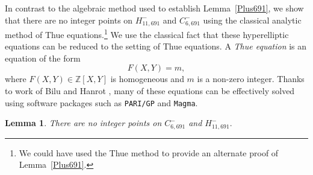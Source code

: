 \documentclass[12pt]{amsart}
\newtheorem{lem}{Lemma}[section]
\newcommand{\Z}{\mathbb{Z}}
\numberwithin{equation}{section}
\begin{document}
In contrast to the algebraic method used to establish Lemma~\ref{Plus691}, we 
show that there are no integer points on $H_{11,691}^{-}$ and $C_{6,691}^{-}$
using the classical analytic method of Thue equations.\footnote{We could have used the Thue method to provide an alternate proof of Lemma~\ref{Plus691}.} We  use the classical fact that these hyperelliptic equations can be reduced to the setting of Thue equations. A {\it Thue equation} is an equation of the form
$$F(X,Y)=m,
$$
where $F(X,Y)\in \Z[X,Y]$ is homogeneous and $m$ is a non-zero integer.
Thanks to work of Bilu and Hanrot \cite{BH96}, many of these equations can be effectively
solved using software packages such as \texttt{PARI/GP} \cite{pari} and \texttt{Magma}.

\begin{lem}\label{Minus691}
There are no integer points on $C^{-}_{6,691}$ and $H^{-}_{11,691}.$
\end{lem}
\end{document}
